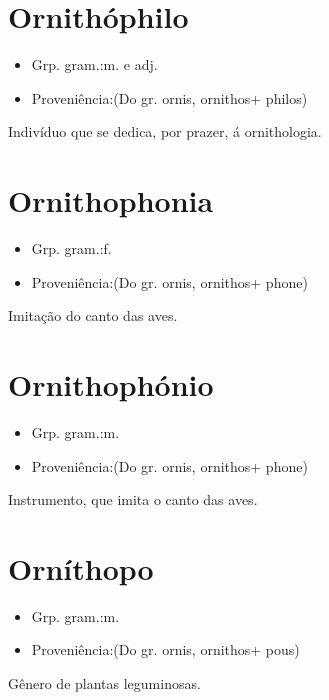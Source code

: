 \section{Ornithóphilo}
\begin{itemize}
\item {Grp. gram.:m.  e  adj.}
\end{itemize}
\begin{itemize}
\item {Proveniência:(Do gr. \textunderscore ornis\textunderscore , \textunderscore ornithos\textunderscore  + \textunderscore philos\textunderscore )}
\end{itemize}
Indivíduo que se dedica, por prazer, á ornithologia.
\section{Ornithophonia}
\begin{itemize}
\item {Grp. gram.:f.}
\end{itemize}
\begin{itemize}
\item {Proveniência:(Do gr. \textunderscore ornis\textunderscore , \textunderscore ornithos\textunderscore  + \textunderscore phone\textunderscore )}
\end{itemize}
Imitação do canto das aves.
\section{Ornithophónio}
\begin{itemize}
\item {Grp. gram.:m.}
\end{itemize}
\begin{itemize}
\item {Proveniência:(Do gr. \textunderscore ornis\textunderscore , \textunderscore ornithos\textunderscore  + \textunderscore phone\textunderscore )}
\end{itemize}
Instrumento, que imita o canto das aves.
\section{Orníthopo}
\begin{itemize}
\item {Grp. gram.:m.}
\end{itemize}
\begin{itemize}
\item {Proveniência:(Do gr. \textunderscore ornis\textunderscore , \textunderscore ornithos\textunderscore  + \textunderscore pous\textunderscore )}
\end{itemize}
Gênero de plantas leguminosas.
